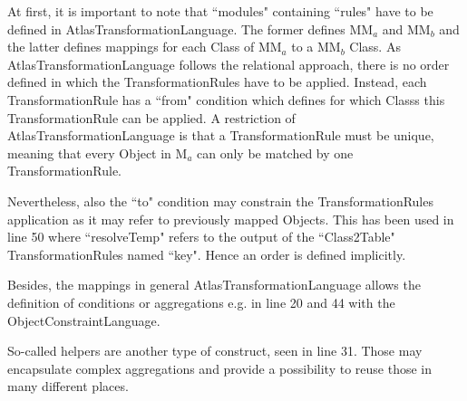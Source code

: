 At first, it is important to note that ``modules" containing ``rules" have to be defined in \gls{AtlasTransformationLanguage}. The former defines MM$_a$ and MM$_b$ and the latter defines mappings for each \gls{Class} of MM$_a$ to a MM$_b$ \gls{Class}. As \gls{AtlasTransformationLanguage} follows the relational approach, there is no order defined in which the \glspl{TransformationRule} have to be applied. Instead, each \gls{TransformationRule} has a ``from" condition which defines for which \glspl{Class} this \gls{TransformationRule} can be applied. A restriction of \gls{AtlasTransformationLanguage} is that a \gls{TransformationRule} must be unique, meaning that every \gls{Object} in M$_a$ can only be matched by one \gls{TransformationRule}.

Nevertheless, also the ``to" condition may constrain the \glspl{TransformationRule} application as it may refer to previously mapped \glspl{Object}. This has been used in line 50 where ``resolveTemp" refers to the output of the ``\Gls{Class}2Table" \glspl{TransformationRule} named ``key". Hence an order is defined implicitly.

Besides, the mappings in general \gls{AtlasTransformationLanguage} allows the definition of conditions or aggregations e.g. in line 20 and 44 with the \gls{ObjectConstraintLanguage}.

So-called helpers are another type of construct, seen in line 31. Those may encapsulate complex aggregations and provide a possibility to reuse those in many different places.

